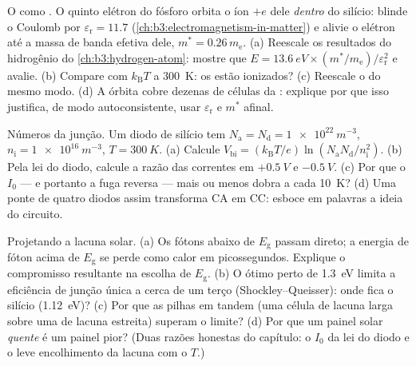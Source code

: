 \begin{exercise}[$\star\star\star$]\label{exo:b3:electrons-in-solids:10}
O  como . O quinto elétron do fósforo
orbita o íon $+e$ dele \emph{dentro} do silício: blinde o Coulomb por
$\varepsilon_{\text{r}} = 11.7$
(\cref{ch:b3:electromagnetism-in-matter}) e alivie o
elétron até a massa de banda efetiva dele, $m^* = 0.26\,m_{\text{e}}$.
(a) Reescale os resultados do hidrogênio do \cref{ch:b3:hydrogen-atom}:
mostre que $E = \qty{13.6}{eV}\times(m^*/m_{\text{e}})/
\varepsilon_{\text{r}}^2$ e avalie. (b) Compare com
$k_{\text{B}}T$ a \qty{300}{K}: os  estão ionizados? (c) Reescale
o  do mesmo modo. (d) A órbita cobre dezenas de
células da : explique por que isso justifica, de modo
autoconsistente, usar $\varepsilon_{\text{r}}$ e $m^*$ afinal.
\end{exercise}

\begin{exercise}[$\star\star\star$]\label{exo:b3:electrons-in-solids:11}
Números da junção. Um diodo de silício tem $N_{\text{a}} =
N_{\text{d}} = \qty{1e22}{m^{-3}}$, $n_{\text{i}} =
\qty{1e16}{m^{-3}}$, $T = \qty{300}{K}$. (a) Calcule
$V_{\text{bi}} = (k_{\text{B}}T/e)\ln(N_{\text{a}}N_{\text{d}}/
n_{\text{i}}^2)$. (b) Pela lei do diodo, calcule a razão das
correntes em $+\qty{0.5}{V}$ e $-\qty{0.5}{V}$. (c) Por que o
$I_0$ --- e portanto a fuga reversa --- mais ou menos dobra a cada
\qty{10}{K}? (d) Uma ponte de quatro diodos assim transforma CA em CC:
esboce em palavras a ideia do circuito.
\end{exercise}

\begin{exercise}[$\star\star\star$]\label{exo:b3:electrons-in-solids:12}
Projetando a lacuna solar. (a) Os fótons abaixo de $E_{\text{g}}$ passam
direto; a energia de fóton acima de $E_{\text{g}}$ se perde como calor
em picossegundos. Explique o compromisso resultante na escolha de
$E_{\text{g}}$. (b) O ótimo perto de \qty{1.3}{eV} limita a
eficiência de junção única a cerca de um terço
(Shockley--Queisser): onde fica o silício
(\qty{1.12}{eV})? (c) Por que as pilhas em tandem (uma célula de lacuna
larga sobre uma de lacuna estreita) superam o limite? (d) Por que um
painel solar \emph{quente} é um painel pior? (Duas razões honestas do
capítulo: o $I_0$ da lei do diodo e o leve encolhimento da lacuna com o $T$.)
\end{exercise}


